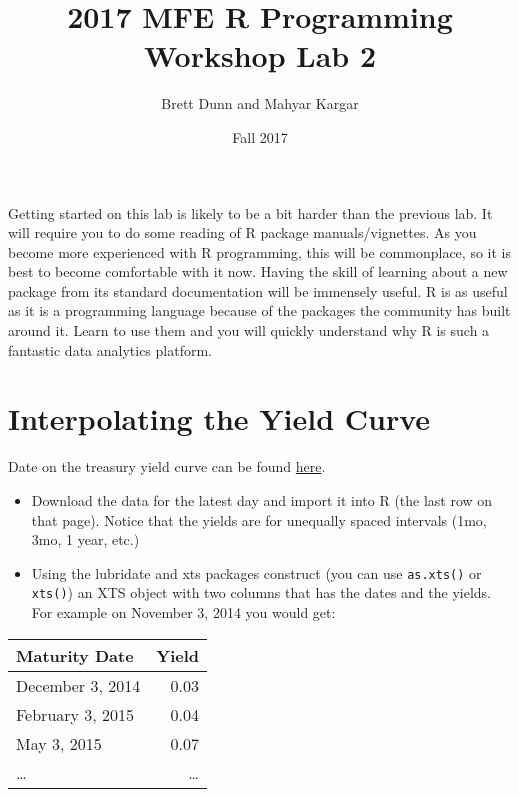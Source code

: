 \documentclass[12pt]{article}
\author{Brett Dunn and Mahyar Kargar}
\date{Fall 2017}
\title{2017 MFE R Programming Workshop Lab 2}
\begin{document}


\maketitle
\onehalfspacing
Getting started on this lab is likely to be a bit harder than the
previous lab. It will require you to do some reading of R package
manuals/vignettes. As you become more experienced with R programming,
this will be commonplace, so it is best to become comfortable with it
now. Having the skill of learning about a new package from its
standard documentation will be immensely useful. R is as useful as it
is a programming language because of the packages the community has
built around it. Learn to use them and you will quickly understand why
R is such a fantastic data analytics platform.

\section*{Interpolating the Yield Curve}
\label{sec-1}
Date on the treasury yield curve can be found \href{http://www.treasury.gov/resource-center/data-chart-center/interest-rates/Pages/TextView.aspx?data=yield}{here}.


\begin{itemize}
\item Download the data for the latest day and import it into R (the last
row on that page). Notice that the yields are for unequally spaced
intervals (1mo, 3mo, 1 year, etc.)
\item Using the lubridate and xts packages construct (you can use \verb~as.xts()~
or \verb~xts()~) an XTS object with two columns that has the dates and
the yields. For example on November 3, 2014 you would get:
\end{itemize}

\begin{center}
\begin{tabular}{lr}
Maturity Date & Yield\\
\hline
December 3, 2014 & 0.03\\
February 3, 2015 & 0.04\\
May 3, 2015 & 0.07\\
\ldots{} & \ldots{}\\
\end{tabular}
\end{center}
\end{document}
